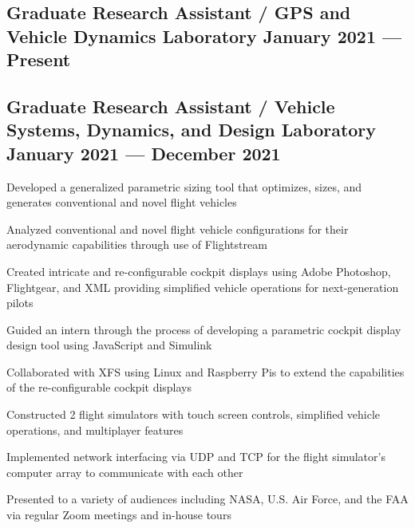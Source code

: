 \documentclass{article}
\begin{document}
\subsection{{Graduate Research Assistant / GPS and Vehicle Dynamics Laboratory \hfill January 2021 --- Present}}
\begin{zitemize}
    \item 
    \item 
    \item 
    \item 
    \item 
    \item 
    \item 
    \item 
\end{zitemize}

\subsection{{Graduate Research Assistant / Vehicle Systems, Dynamics, and Design Laboratory \hfill January 2021 --- December 2021}}
\begin{zitemize}
    \item Developed a generalized parametric sizing tool that optimizes, sizes, and generates conventional and novel flight vehicles
    \item Analyzed conventional and novel flight vehicle configurations for their aerodynamic capabilities through use of Flightstream
    \item Created intricate and re-configurable cockpit displays using Adobe Photoshop, Flightgear, and XML providing simplified vehicle operations for next-generation
    pilots
    \item Guided an intern through the process of developing a parametric cockpit display design tool using JavaScript and Simulink
    \item Collaborated with XFS using Linux and Raspberry Pis to extend the capabilities of the re-configurable cockpit displays
    \item Constructed 2 flight simulators with touch screen controls, simplified vehicle operations, and multiplayer features
    \item Implemented network interfacing via UDP and TCP for the flight simulator's computer array to communicate with each other
    \item Presented to a variety of audiences including NASA, U.S. Air Force, and the FAA via regular Zoom meetings and in-house tours
\end{zitemize}
\end{document}
